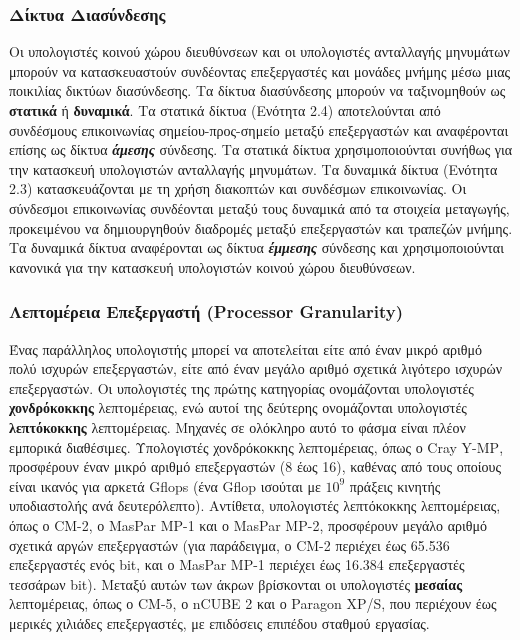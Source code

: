 \documentclass[12pt,a4paper]{article}
\begin{document}
\subsubsection{Δίκτυα Διασύνδεσης}
Οι υπολογιστές κοινού χώρου διευθύνσεων και οι υπολογιστές ανταλλαγής μηνυμάτων
μπορούν να κατασκευαστούν συνδέοντας επεξεργαστές και μονάδες μνήμης μέσω μιας
ποικιλίας δικτύων διασύνδεσης. Τα δίκτυα διασύνδεσης μπορούν να ταξινομηθούν ως
\textbf{στατικά} ή \textbf{δυναμικά}. Τα στατικά δίκτυα (Ενότητα 2.4)
αποτελούνται από συνδέσμους επικοινωνίας σημείου-προς-σημείο μεταξύ επεξεργαστών
και αναφέρονται επίσης ως δίκτυα \textit{\textbf{άμεσης}} σύνδεσης. Τα στατικά δίκτυα
χρησιμοποιούνται συνήθως για την κατασκευή υπολογιστών ανταλλαγής μηνυμάτων.
Τα δυναμικά δίκτυα (Ενότητα 2.3) κατασκευάζονται με τη χρήση διακοπτών και
συνδέσμων επικοινωνίας. Οι σύνδεσμοι επικοινωνίας συνδέονται μεταξύ τους δυναμικά
από τα στοιχεία μεταγωγής, προκειμένου να δημιουργηθούν διαδρομές μεταξύ
επεξεργαστών και τραπεζών μνήμης. Τα δυναμικά δίκτυα αναφέρονται ως δίκτυα
\textit{\textbf{έμμεσης}} σύνδεσης και χρησιμοποιούνται κανονικά για την κατασκευή
υπολογιστών κοινού χώρου διευθύνσεων.

\subsubsection{Λεπτομέρεια Επεξεργαστή (\foreignlanguage{english}{Processor Granularity})}
Ένας παράλληλος υπολογιστής μπορεί να αποτελείται είτε από έναν μικρό 
αριθμό πολύ ισχυρών επεξεργαστών, είτε από έναν μεγάλο αριθμό σχετικά 
λιγότερο ισχυρών επεξεργαστών. Οι υπολογιστές της πρώτης κατηγορίας 
ονομάζονται υπολογιστές \textbf{χονδρόκοκκης} λεπτομέρειας, ενώ αυτοί της 
δεύτερης ονομάζονται υπολογιστές \textbf{λεπτόκοκκης} λεπτομέρειας. Μηχανές 
σε ολόκληρο αυτό το φάσμα είναι πλέον εμπορικά διαθέσιμες. Υπολογιστές 
χονδρόκοκκης λεπτομέρειας, όπως ο \foreignlanguage{english}{Cray Y-MP}, 
προσφέρουν έναν μικρό αριθμό επεξεργαστών (8 έως 16), καθένας από τους 
οποίους είναι ικανός για αρκετά \foreignlanguage{english}{Gflops} 
(ένα \foreignlanguage{english}{Gflop} ισούται με $10^9$ πράξεις κινητής 
υποδιαστολής ανά δευτερόλεπτο). Αντίθετα, υπολογιστές λεπτόκοκκης 
λεπτομέρειας, όπως ο \foreignlanguage{english}{CM-2}, ο 
\foreignlanguage{english}{MasPar MP-1} και ο \foreignlanguage{english}{MasPar MP-2},
προσφέρουν μεγάλο αριθμό σχετικά αργών επεξεργαστών (για παράδειγμα, ο 
\foreignlanguage{english}{CM-2} περιέχει έως 65.536 επεξεργαστές ενός 
\foreignlanguage{english}{bit}, και ο \foreignlanguage{english}{MasPar MP-1} 
περιέχει έως 16.384 επεξεργαστές τεσσάρων \foreignlanguage{english}{bit}). 
Μεταξύ αυτών των άκρων βρίσκονται οι υπολογιστές \textbf{μεσαίας} λεπτομέρειας, 
όπως ο \foreignlanguage{english}{CM-5}, ο \foreignlanguage{english}{nCUBE 2} 
και ο \foreignlanguage{english}{Paragon XP/S}, που περιέχουν έως μερικές 
χιλιάδες επεξεργαστές, με επιδόσεις επιπέδου σταθμού εργασίας.
\end{document}
